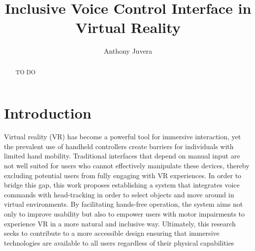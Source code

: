 \documentclass[manuscript, screen, review]{acmart}
\begin{document}
\title{Inclusive Voice Control Interface in Virtual Reality}

\author{Anthony Juvera}



\begin{abstract}
  TO DO
\end{abstract}





\maketitle

\section{Introduction}
Virtual reality (VR) has become a powerful tool for immersive interaction, yet the prevalent use of handheld controllers create barriers for individuals with limited hand mobility. Traditional interfaces that depend on manual input are not well suited for users who cannot effectively manipulate these devices, thereby excluding potential users from fully engaging with VR experiences. In order to bridge this gap, this work proposes establishing a system that integrates voice commands with head-tracking in order to select objects and move around in virtual environments.  By facilitating hands-free operation, the system aims not only to improve usability but also to empower users with motor impairments to experience VR in a more natural and inclusive way. Ultimately, this research seeks to contribute to a more accessible design ensuring that immersive technologies are available to all users regardless of their physical capabilities 
\end{document}
